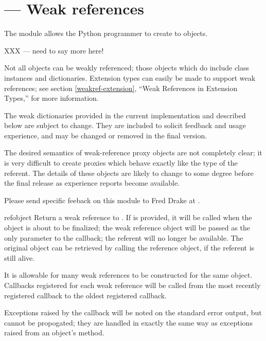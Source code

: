 \section{ ---
         Weak references}




The  module allows the Python programmer to create
 to objects.

XXX --- need to say more here!

Not all objects can be weakly referenced; those objects which do
include class instances and dictionaries.  Extension types can easily
be made to support weak references; see section \ref{weakref-extension},
``Weak References in Extension Types,'' for more information.


The weak dictionaries provided in the current implementation and
described below are subject to change.  They are included to solicit
feedback and usage experience, and may be changed or removed in the
final version.

The desired semantics of weak-reference proxy objects are not
completely clear; it is very difficult to create proxies which behave
exactly like the type of the referent.  The details of these objects
are likely to change to some degree before the final release as
experience reports become available.

Please send specific feeback on this module to Fred Drake at
.


\begin{funcdesc}{ref}{object}
  Return a weak reference to .  If  is
  provided, it will be called when the object is about to be
  finalized; the weak reference object will be passed as the only
  parameter to the callback; the referent will no longer be available.
  The original object can be retrieved by calling the reference
  object, if the referent is still alive.

  It is allowable for many weak references to be constructed for the
  same object.  Callbacks registered for each weak reference will be
  called from the most recently registered callback to the oldest
  registered callback.

  Exceptions raised by the callback will be noted on the standard
  error output, but cannot be propogated; they are handled in exactly
  the same way as exceptions raised from an object's
   method.
\end{funcdesc}

